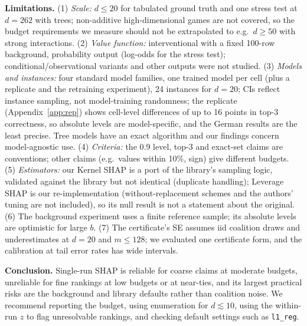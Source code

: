 \documentclass{article}
\begin{document}
\textbf{Limitations.} (1) \emph{Scale:} $d\le20$ for tabulated ground truth and one stress test at $d{=}262$ with trees; non-additive high-dimensional games are not covered, so the budget requirements we measure should not be extrapolated to e.g.\ $d\ge50$ with strong interactions. (2) \emph{Value function:} interventional with a fixed 100-row background, probability output (log-odds for the stress test); conditional/observational variants \citep{chen2020} and other outputs were not studied. (3) \emph{Models and instances:} four standard model families, one trained model per cell (plus a replicate and the retraining experiment), 24 instances for $d{=}20$; CIs reflect instance sampling, not model-training randomness; the replicate (Appendix~\ref{app:rep}) shows cell-level differences of up to 16 points in top-3 correctness, so absolute levels are model-specific, and the German results are the least precise. Tree models have an exact algorithm \citep{lundberg2020} and our findings concern model-agnostic use. (4) \emph{Criteria:} the 0.9 level, top-3 and exact-set claims are conventions; other claims (e.g.\ values within 10\%, sign) give different budgets. (5) \emph{Estimators:} our Kernel SHAP is a port of the library's sampling logic, validated against the library but not identical (duplicate handling); Leverage SHAP is our re-implementation (without-replacement schemes and the authors' tuning are not included), so its null result is not a statement about the original. (6) The background experiment uses a finite reference sample; its absolute levels are optimistic for large $b$. (7) The certificate's SE assumes iid coalition draws and underestimates at $d{=}20$ and $m\le128$; we evaluated one certificate form, and the calibration at tail error rates has wide intervals.

\textbf{Conclusion.} Single-run SHAP is reliable for coarse claims at moderate budgets, unreliable for fine rankings at low budgets or at near-ties, and its largest practical risks are the background and library defaults rather than coalition noise. We recommend reporting the budget, using enumeration for $d\lesssim10$, using the within-run $z$ to flag unresolvable rankings, and checking default settings such as \texttt{l1\_reg}.




\appendix
\end{document}
